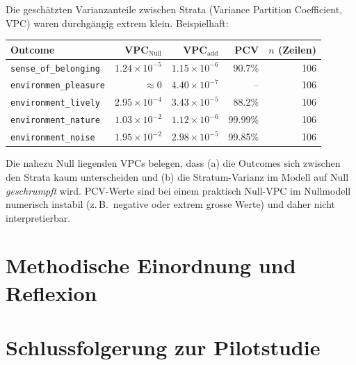 Die geschätzten Varianzanteile zwischen Strata (Variance Partition Coefficient, VPC) waren durchgängig extrem klein. Beispielhaft:

\begin{center}
\begin{tabular}{lrrrr}
\toprule
Outcome & VPC$_{\text{Null}}$ & VPC$_{\text{add}}$ & PCV & $n$ (Zeilen) \\
\midrule
\texttt{sense\_of\_belonging}      & $1.24\times 10^{-5}$ & $1.15\times 10^{-6}$ & 90.7\% & 106 \\
\texttt{environmen\_pleasure}      & $\approx 0$          & $4.40\times 10^{-7}$ & --      & 106 \\
\texttt{environment\_lively}       & $2.95\times 10^{-4}$ & $3.43\times 10^{-5}$ & 88.2\%  & 106 \\
\texttt{environment\_nature}       & $1.03\times 10^{-2}$ & $1.12\times 10^{-6}$ & 99.99\% & 106 \\
\texttt{environment\_noise}        & $1.95\times 10^{-2}$ & $2.98\times 10^{-5}$ & 99.85\% & 106 \\
\bottomrule
\end{tabular}
\end{center}

Die nahezu Null liegenden VPCs belegen, dass (a) die Outcomes sich zwischen den Strata kaum unterscheiden und (b) die Stratum-Varianz im Modell auf Null \emph{geschrumpft} wird. PCV-Werte sind bei einem praktisch Null-VPC im Nullmodell numerisch instabil (z.\,B.\ negative oder extrem grosse Werte) und daher nicht interpretierbar.

\section{Methodische Einordnung und Reflexion}

\section{Schlussfolgerung zur Pilotstudie}



